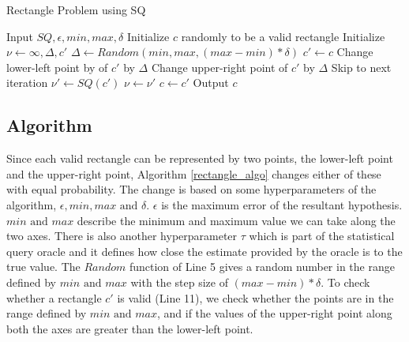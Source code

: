 \begin{algorithm}[!h]
\caption{Rectangle Problem using SQ}
\label{rectangle_algo}
\begin{algorithmic}[1]
\State Input $SQ, \epsilon, min, max, \delta$
\State Initialize $c$ randomly to be a valid rectangle
\State Initialize $\nu \gets \infty, \Delta, c'$
    \State $\Delta \gets Random(min, max, (max-min)*\delta)$
    \State $c' \gets c$
        \State Change lower-left point by of $c'$ by $\Delta$
    \Else
        \State Change upper-right point of $c'$ by $\Delta$
    \EndIf
        \State Skip to next iteration
    \EndIf
    \State $\nu' \gets SQ(c')$
        \State $\nu \gets \nu'$
        \State $c \gets c'$
    \EndIf
\EndWhile
\State Output $c$
\end{algorithmic}    
\end{algorithm}

\subsection{Algorithm}

Since each valid rectangle can be represented by two points, the lower-left point and the upper-right point, Algorithm \ref{rectangle_algo} changes either of these with equal probability. The change is based on some hyperparameters of the algorithm, $\epsilon, min, max \text{ and } \delta$. $\epsilon$ is the maximum error of the resultant hypothesis. $min \text{ and } max$ describe the minimum and maximum value we can take along the two axes. There is also another hyperparameter $\tau$ which is part of the statistical query oracle and it defines how close the estimate provided by the oracle is to the true value. The $Random$ function of Line 5 gives a random number in the range defined by $min \text{ and } max$ with the step size of $(max-min)*\delta$. To check whether a rectangle $c'$ is valid (Line 11), we check whether the points are in the range defined by $min \text{ and } max$, and if the values of the upper-right point along both the axes are greater than the lower-left point.

